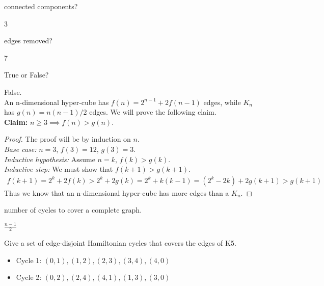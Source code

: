 \documentclass[11pt]{article}
\begin{document}
    \begin{Parts}

        \Part connected components?

        \begin{Answer}
            3
        \end{Answer}

        \Part edges removed? 

        \begin{Answer}
            7
        \end{Answer}
        
        \Part True or False? 

        \begin{Answer}
            False. \\
            An n-dimensional hyper-cube has $f(n)=2^{n-1}+2f(n-1)$ edges, while $K_n$ has $g(n)=n(n-1)/2$ edges. 
            We will prove the following claim. \\
            \textbf{Claim:} $n\geq3 \implies f(n) > g(n)$.
            \begin{proof}
                The proof will be by induction on $n$. \\
                \emph{Base case:} $n=3$, $f(3)=12$, $g(3)=3$. \\
                \emph{Inductive hypothesis:} Assume $n=k$, $f(k)>g(k)$. \\
                \emph{Inductive step:} We must show that $f(k+1)>g(k+1)$. 
                \begin{align*}
                    f(k+1)=2^k+2f(k)>2^k+2g(k)=2^k+k(k-1)=(2^k-2k)+2g(k+1)>g(k+1)
                \end{align*}
                Thus we know that an n-dimensional hyper-cube has more edges than a $K_n$. 
            \end{proof}
        \end{Answer}

        \Part number of cycles to cover a complete graph. 

        \begin{Answer}
            $\frac{n-1}{2}$
        \end{Answer}

        \Part Give a set of edge-disjoint Hamiltonian cycles that covers the edges of K5.
        
        \begin{Answer}
            \begin{itemize}
                \item Cycle 1: $(0,1),(1,2),(2,3),(3,4),(4,0)$
                \item Cycle 2: $(0,2),(2,4),(4,1),(1,3),(3,0)$
            \end{itemize}
        \end{Answer}
    \end{Parts}
\end{document}
